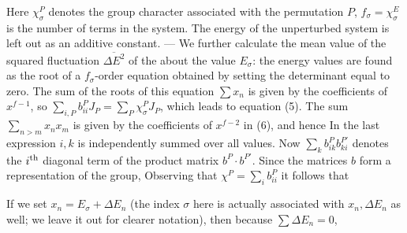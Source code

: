 \begin{paper}{1}
Here $\chi_\sigma^P$ denotes the group character associated with the permutation $P$, $f_\sigma = \chi_\sigma^E$ is the number of terms in the system. The energy of the unperturbed system is left out as an additive constant. — We further calculate the mean value of the squared fluctuation $\overline{\Delta E^2}$ of the about the value $E_\sigma$: the energy values are found as the root of a $f_\sigma$-order equation obtained by setting the determinant
equal to zero. The sum of the roots of this equation $\sum x_n$ is given by the coefficients of $x^{f-1}$, so $\sum\limits_{i,P}b_{ii}^P J_P = \sum\limits_P \chi_\sigma^P J_P$, which leads to equation (5). The sum $\sum\limits_{n>m} x_n x_m$ is given by the coefficients of $x^{f-2}$ in (6), and hence
In the last expression $i, k$ is independently summed over all values. Now $\sum\limits_k b_{ik}^P b_{ki}^{P'}$ denotes the ${i}^\text{th}$ diagonal term of the product matrix $b^P\cdot b^{P'}$. Since the matrices $b$ form a representation of the group,
Observing that $\chi^P = \sum\limits_i b_{ii}^P$ it follows that

If we set $x_n = E_\sigma + \Delta E_n$ (the index $\sigma$ here is actually associated with $x_n, \Delta E_n$ as well; we leave it out for clearer notation), then
because $\sum\Delta E_n = 0$,


\end{paper}
